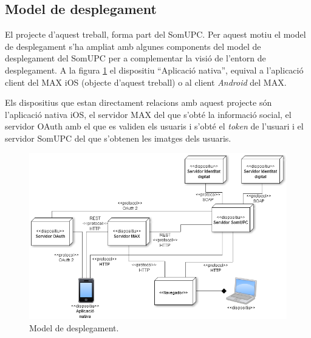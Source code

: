 
\subsection{Model de desplegament}

El projecte d'aquest treball, forma part del SomUPC. Per aquest motiu el model de desplegament s'ha ampliat amb algunes components del model de desplegament del SomUPC per a complementar la visió de l'entorn de desplegament. A la figura \ref{fig:desplegament} el dispositiu ``Aplicació nativa'', equival a l'aplicació client del MAX iOS (objecte d'aquest treball) o al client \textit{Android} del MAX.

Els dispositius que estan directament relacions amb aquest projecte són l'aplicació nativa iOS, el servidor MAX del que s'obté la informació social, el servidor OAuth amb el que es validen els usuaris i s'obté el \textit{token} de l'usuari i el servidor SomUPC del que s'obtenen les imatges dels usuaris.

\begin{figure}[ht]
    \centering
    \includegraphics*[scale=0.7]{Memoria/Arquitectura/Projecte/desplegament.png}
    \caption{Model de desplegament.}
    \label{fig:desplegament}
\end{figure}
\clearpage
